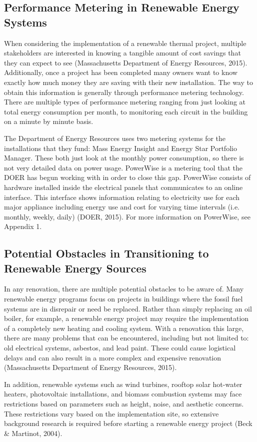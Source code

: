     \subsection{Performance Metering in Renewable Energy Systems}
    \par When considering the implementation of a renewable thermal project, multiple stakeholders are interested in knowing a tangible amount of cost savings that they can expect to see (Massachusetts Department of Energy Resources, 2015). Additionally, once a project has been completed many owners want to know exactly how much money they are saving with their new installation. The way to obtain this information is generally through performance metering technology. There are multiple types of performance metering ranging from just looking at total energy consumption per month, to monitoring each circuit in the building on a minute by minute basis.
    \par The Department of Energy Resources uses two metering systems for the installations that they fund: Mass Energy Insight and Energy Star Portfolio Manager. These both just look at the monthly power consumption, so there is not very detailed data on power usage. PowerWise is a metering tool that the DOER has begun working with in order to close this gap. PowerWise consists of hardware installed inside the electrical panels that communicates to an online interface. This interface shows information relating to electricity use for each major appliance including energy use and cost for varying time intervals (i.e. monthly, weekly, daily) (DOER, 2015). For more information on PowerWise, see Appendix 1.

    \subsection{Potential Obstacles in Transitioning to Renewable Energy Sources}
    \par In any renovation, there are multiple potential obstacles to be aware of. Many renewable energy programs focus on projects in buildings where the fossil fuel systems are in disrepair or need be replaced. Rather than simply replacing an oil boiler, for example, a renewable energy project may require the implementation of a completely new heating and cooling system. With a renovation this large, there are many problems that can be encountered, including but not limited to: old electrical systems, asbestos, and lead paint. These could cause logistical delays and can also result in a more complex and expensive renovation (Massachusetts Department of Energy Resources, 2015).
    \par In addition, renewable systems such as wind turbines, rooftop solar hot-water heaters, photovoltaic installations, and biomass combustion systems may face restrictions based on parameters such as height, noise, and aesthetic concerns. These restrictions vary based on the implementation site, so extensive background research is required before starting a renewable energy project (Beck \& Martinot, 2004).

